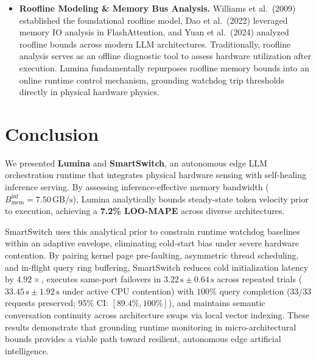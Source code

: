\documentclass[11pt,a4paper]{article}
\newcommand{\Binf}{B_{\mathrm{mem}}^{\mathrm{inf}}}
\newcommand{\GBs}{\,\mathrm{GB/s}}
\newcommand{\su}{\,\mathrm{s}}
\begin{document}
\begin{itemize}[leftmargin=*]
\item \textbf{Roofline Modeling \& Memory Bus Analysis.} Williams et al.\ (2009) established the foundational roofline model, Dao et al.\ (2022) leveraged memory IO analysis in FlashAttention, and Yuan et al.\ (2024) analyzed roofline bounds across modern LLM architectures. Traditionally, roofline analysis serves as an offline diagnostic tool to assess hardware utilization after execution. Lumina fundamentally repurposes roofline memory bounds into an online runtime control mechanism, grounding watchdog trip thresholds directly in physical hardware physics.
\end{itemize}

\section{Conclusion}\label{sec:conclusion}
We presented \textbf{Lumina} and \textbf{SmartSwitch}, an autonomous edge LLM orchestration runtime that integrates physical hardware sensing with self-healing inference serving. By assessing inference-effective memory bandwidth ($\Binf = 7.50\GBs$), Lumina analytically bounds steady-state token velocity prior to execution, achieving a \textbf{7.2\% LOO-MAPE} across diverse architectures.

SmartSwitch uses this analytical prior to constrain runtime watchdog baselines within an adaptive envelope, eliminating cold-start bias under severe hardware contention. By pairing kernel page pre-faulting, asymmetric thread scheduling, and in-flight query ring buffering, SmartSwitch reduces cold initialization latency by \textbf{$4.92\times$}, executes same-port failovers in \textbf{$3.22\su \pm 0.64\su$} across repeated trials ($33.45\su \pm 1.92\su$ under active CPU contention) with $100\%$ query completion ($33/33$ requests preserved; 95\% CI: $[89.4\%, 100\%]$), and maintains semantic conversation continuity across architecture swaps via local vector indexing. These results demonstrate that grounding runtime monitoring in micro-architectural bounds provides a viable path toward resilient, autonomous edge artificial intelligence.
\end{document}
